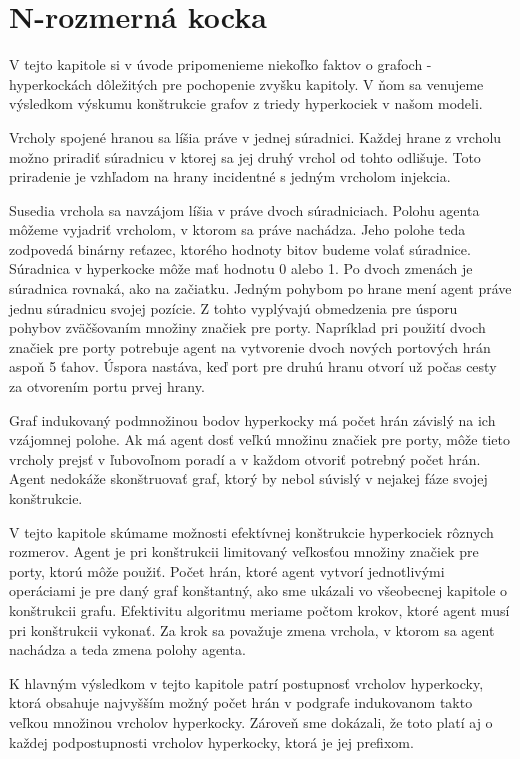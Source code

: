 {}



\chapter{N-rozmerná kocka}
V tejto kapitole si v úvode pripomenieme niekoľko faktov o grafoch - 
hyperkockách dôležitých pre pochopenie zvyšku kapitoly. V ňom sa venujeme
výsledkom výskumu konštrukcie grafov z triedy hyperkociek v našom modeli.

Vrcholy spojené hranou sa líšia práve v jednej súradnici. Každej hrane z
vrcholu možno priradiť súradnicu v ktorej sa jej druhý vrchol od tohto
odlišuje. Toto priradenie je vzhľadom na hrany incidentné s jedným vrcholom
 injekcia.

Susedia vrchola sa navzájom líšia v práve dvoch súradniciach. Polohu agenta
môžeme vyjadriť vrcholom, v ktorom sa práve nachádza. Jeho polohe teda
zodpovedá
binárny reťazec, ktorého hodnoty bitov budeme volať súradnice. Súradnica v
hyperkocke môže mať hodnotu 0 alebo 1. Po dvoch zmenách je súradnica
rovnaká, ako na začiatku.
 Jedným pohybom po hrane mení agent práve jednu súradnicu svojej pozície. 
Z tohto vyplývajú obmedzenia
pre úsporu pohybov zväčšovaním množiny značiek pre porty. 
Napríklad pri použití dvoch
značiek pre porty potrebuje agent na vytvorenie dvoch nových portových hrán
aspoň 5 ťahov. Úspora nastáva, keď port pre druhú hranu otvorí už počas
cesty za otvorením portu prvej hrany.

Graf indukovaný podmnožinou bodov hyperkocky má počet hrán závislý na ich
vzájomnej polohe. Ak má agent dosť veľkú množinu značiek pre porty, môže
tieto vrcholy prejsť v ľubovoľnom poradí a v každom otvoriť potrebný počet
hrán. Agent nedokáže skonštruovať graf, ktorý by nebol súvislý v nejakej
fáze svojej konštrukcie.

V tejto kapitole skúmame možnosti efektívnej konštrukcie hyperkociek rôznych
rozmerov. Agent je pri konštrukcii limitovaný veľkosťou množiny značiek pre
porty, ktorú môže použiť. Počet hrán, ktoré agent vytvorí jednotlivými
operáciami je pre daný graf konštantný, ako sme ukázali vo všeobecnej kapitole o
konštrukcii grafu. Efektivitu algoritmu meriame počtom krokov, ktoré agent
musí pri konštrukcii vykonať. Za krok sa považuje zmena vrchola, v ktorom sa
agent nachádza a teda zmena polohy agenta.

K hlavným výsledkom v tejto kapitole patrí postupnosť vrcholov hyperkocky, 
ktorá
obsahuje najvyšším možný počet hrán v podgrafe indukovanom takto veľkou
množinou vrcholov hyperkocky. Zároveň sme dokázali, že toto platí aj o každej
podpostupnosti vrcholov hyperkocky, ktorá je jej prefixom.

